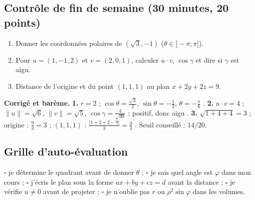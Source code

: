 \subsection{Contrôle de fin de semaine (30 minutes, 20 points)}
\begin{enumerate}
 \item {} Donner les coordonnées polaires de $(\sqrt3,-1)$ ($\theta\in]-\pi;\pi]$).
 \item {} Pour $u=(1,-1,2)$ et $v=(2,0,1)$, calculer $u\cdot v$, $\cos\gamma$ et dire si $\gamma$ est aigu.
 \item {} Distance de l'origine et du point $(1,1,1)$ au plan $x+2y+2z=9$.
\end{enumerate}
\ifcorr
\textbf{Corrigé et barème.} \textbf{1.} $r=2$  ; $\cos\theta=\frac{\sqrt3}2$, $\sin\theta=-\frac12$, $\theta=-\frac\pi6$ . \textbf{2.} $u\cdot v=4$  ; $\|u\|=\sqrt6$, $\|v\|=\sqrt5$, $\cos\gamma=\frac4{\sqrt{30}}$  ; positif, donc aigu . \textbf{3.} $\sqrt{1+4+4}=3$ ; origine : $\frac93=3$  ; $(1,1,1)$ : $\frac{|1+2+2-9|}3=\frac43$ . Seuil conseillé : $14/20$.
\fi

\subsection{Grille d'auto-évaluation}
$\square$ je détermine le quadrant avant de donner $\theta$ ; $\square$ je sais quel angle est $\varphi$ dans mon cours ; $\square$ j'écris le plan sous la forme $ax+by+cz=d$ avant la distance ; $\square$ je vérifie $u\ne0$ avant de projeter ; $\square$ je n'oublie pas $r$ ou $\rho^2\sin\varphi$ dans les volumes.
